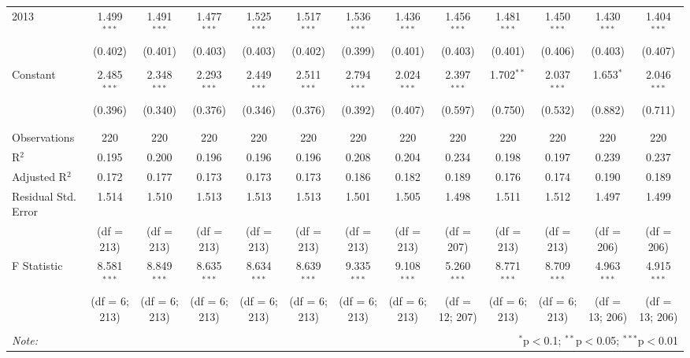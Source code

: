 \begin{table}[H]
\begin{adjustbox}{width=\textwidth}
\begin{tabular}{@{\extracolsep{5pt}}lcccccccccccc}
 2013 & 1.499$^{***}$ & 1.491$^{***}$ & 1.477$^{***}$ & 1.525$^{***}$ & 1.517$^{***}$ & 1.536$^{***}$ & 1.436$^{***}$ & 1.456$^{***}$ & 1.481$^{***}$ & 1.450$^{***}$ & 1.430$^{***}$ & 1.404$^{***}$ \\ 
  & (0.402) & (0.401) & (0.403) & (0.403) & (0.402) & (0.399) & (0.401) & (0.403) & (0.401) & (0.406) & (0.403) & (0.407) \\ 
  & & & & & & & & & & & & \\ 
 Constant & 2.485$^{***}$ & 2.348$^{***}$ & 2.293$^{***}$ & 2.449$^{***}$ & 2.511$^{***}$ & 2.794$^{***}$ & 2.024$^{***}$ & 2.397$^{***}$ & 1.702$^{**}$ & 2.037$^{***}$ & 1.653$^{*}$ & 2.046$^{***}$ \\ 
  & (0.396) & (0.340) & (0.376) & (0.346) & (0.376) & (0.392) & (0.407) & (0.597) & (0.750) & (0.532) & (0.882) & (0.711) \\ 
  & & & & & & & & & & & & \\ 
\hline \\[-1.8ex] 
Observations & 220 & 220 & 220 & 220 & 220 & 220 & 220 & 220 & 220 & 220 & 220 & 220 \\ 
R$^{2}$ & 0.195 & 0.200 & 0.196 & 0.196 & 0.196 & 0.208 & 0.204 & 0.234 & 0.198 & 0.197 & 0.239 & 0.237 \\ 
Adjusted R$^{2}$ & 0.172 & 0.177 & 0.173 & 0.173 & 0.173 & 0.186 & 0.182 & 0.189 & 0.176 & 0.174 & 0.190 & 0.189 \\ 
Residual Std. Error & 1.514  & 1.510  & 1.513 & 1.513  & 1.513  & 1.501 & 1.505 & 1.498 & 1.511  & 1.512 & 1.497 & 1.499 \\ 
& (df = 213) & (df = 213) & (df = 213) & (df = 213) & (df = 213) & (df = 213) & (df = 213) & (df = 207) & (df = 213) & (df = 213) & (df = 206) & (df = 206) \\
F Statistic & 8.581$^{***}$ & 8.849$^{***}$  & 8.635$^{***}$  & 8.634$^{***}$  & 8.639$^{***}$ & 9.335$^{***}$ & 9.108$^{***}$ & 5.260$^{***}$ & 8.771$^{***}$  & 8.709$^{***}$ & 4.963$^{***}$ & 4.915$^{***}$  \\ 
& (df = 6; 213) & (df = 6; 213)  & (df = 6; 213)  & (df = 6; 213)  & (df = 6; 213)  & (df = 6; 213)  & (df = 6; 213)  & (df = 12; 207) & (df = 6; 213)  & (df = 6; 213)  & (df = 13; 206)  & (df = 13; 206) \\
\hline 
\hline \\[-1.8ex] 
\textit{Note:}  & \multicolumn{12}{r}{$^{*}$p$<$0.1; $^{**}$p$<$0.05; $^{***}$p$<$0.01} \\ 
\end{tabular} 
\end{adjustbox}
\end{table} 
   

